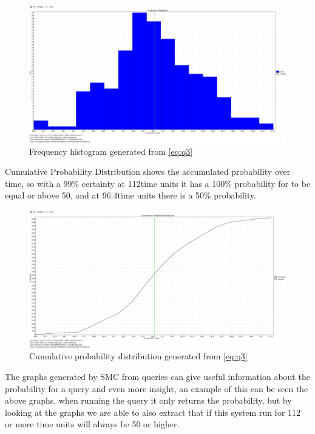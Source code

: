 \begin{figure}[!h]
	\includegraphics[width=\textwidth]{graphics/eq3fh.png}
	\caption{Frequency histogram generated from \cref{eq:q3}}
	\label{fig:eq3fh}
\end{figure}

Cumulative Probability Distribution shows the accumulated probability over time, so with a 99\% certainty at 112time units it has a 100\% probability for  to be equal or above 50, and at 96.4time units there is a 50\% probability.

\begin{figure}[!h]
	\includegraphics[width=\textwidth]{graphics/eq3cpd.png}
	\caption{Cumulative probability distribution generated from \cref{eq:q3}}
	\label{fig:eq3cpd}
\end{figure}

The graphs generated by SMC from queries can give useful information about the probability for a query and even more insight, an example of this can be seen the above graphs, when running the query it only returns the probability, but by looking at the graphs we are able to also extract that if this system run for 112 or more time units  will always be 50 or higher.

